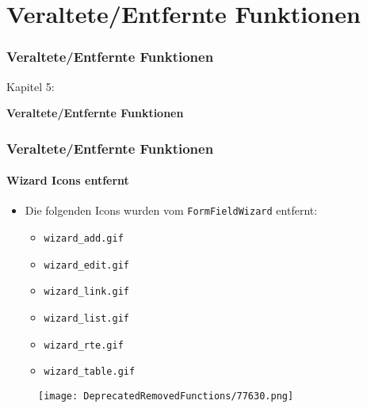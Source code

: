 %

\section{Veraltete/Entfernte Funktionen}
\begin{frame}[fragile]
	\frametitle{Veraltete/Entfernte Funktionen}

	\begin{center}\huge{Kapitel 5:}\end{center}
	\begin{center}\huge{\color{typo3darkgrey}\textbf{Veraltete/Entfernte Funktionen}}\end{center}

\end{frame}

\begin{frame}[fragile]
	\frametitle{Veraltete/Entfernte Funktionen}
	\framesubtitle{Wizard Icons entfernt}

	\begin{itemize}

		\item Die folgenden Icons wurden vom \texttt{FormFieldWizard} entfernt:

			\begin{itemize}
				\item \texttt{wizard\_add.gif}
				\item \texttt{wizard\_edit.gif}
				\item \texttt{wizard\_link.gif}
				\item \texttt{wizard\_list.gif}
				\item \texttt{wizard\_rte.gif}
				\item \texttt{wizard\_table.gif}
			\end{itemize}

	\end{itemize}

	\begin{figure}
		\texttt{[image: DeprecatedRemovedFunctions/77630.png]}
	\end{figure}

\end{frame}

